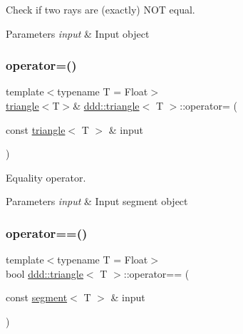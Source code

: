 Check if two rays are (exactly) N\+OT equal. 


\begin{DoxyParams}{Parameters}
{\em input} & Input object \\
\hline
\end{DoxyParams}
\mbox{\label{classddd_1_1triangle_a6f8b514ac16be9c700105484f0d8b6b1}} 
\subsubsection{\texorpdfstring{operator=()}{operator=()}}
{\footnotesize\ttfamily template$<$typename T = Float$>$ \\
\hyperlink{classddd_1_1triangle}{triangle}$<$T$>$\& \hyperlink{classddd_1_1triangle}{ddd\+::triangle}$<$ T $>$\+::operator= (\begin{DoxyParamCaption}\item[{const \hyperlink{classddd_1_1triangle}{triangle}$<$ T $>$ \&}]{input }\end{DoxyParamCaption})\hspace{0.3cm}{\ttfamily [inline]}}



Equality operator. 


\begin{DoxyParams}{Parameters}
{\em input} & Input segment object \\
\hline
\end{DoxyParams}
\mbox{\label{classddd_1_1triangle_abc6795d1b802b4386c84047386d7b0c7}} 
\subsubsection{\texorpdfstring{operator==()}{operator==()}}
{\footnotesize\ttfamily template$<$typename T = Float$>$ \\
bool \hyperlink{classddd_1_1triangle}{ddd\+::triangle}$<$ T $>$\+::operator== (\begin{DoxyParamCaption}\item[{const \hyperlink{classddd_1_1segment}{segment}$<$ T $>$ \&}]{input }\end{DoxyParamCaption})\hspace{0.3cm}{\ttfamily [inline]}}



